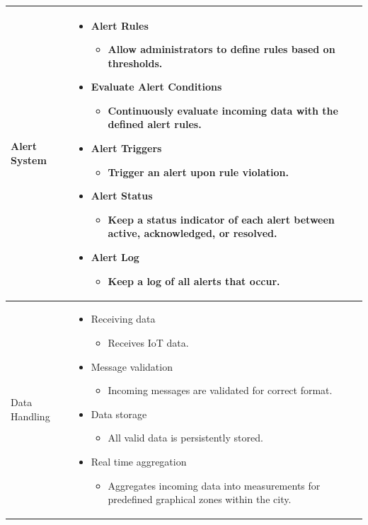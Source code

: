 \documentclass[]{article}
\begin{document}
\begin{longtable}{|p{3cm}|p{12cm}|}
Alert System &
\begin{itemize}
    \item Alert Rules
        \begin{itemize}
            \item Allow administrators to define rules based on thresholds.
        \end{itemize}
    \item Evaluate Alert Conditions
        \begin{itemize}
            \item Continuously evaluate incoming data with the defined alert rules.
        \end{itemize}
    \item Alert Triggers
        \begin{itemize}
            \item Trigger an alert upon rule violation.
        \end{itemize}
    \item Alert Status
        \begin{itemize}
            \item Keep a status indicator of each alert between active, acknowledged, or resolved.
        \end{itemize}
    \item Alert Log
        \begin{itemize}
            \item Keep a log of all alerts that occur.
        \end{itemize}
\end{itemize}
\\[5pt]
\hline

Data Handling & 
\begin{itemize}
    \item Receiving data
        \begin{itemize}
            \item Receives IoT data.
        \end{itemize}
    \item Message validation
        \begin{itemize}
            \item Incoming messages are validated for correct format.
        \end{itemize}
    \item Data storage
        \begin{itemize}
            \item All valid data is persistently stored.
        \end{itemize}
    \item Real time aggregation
        \begin{itemize}
            \item Aggregates incoming data into measurements for predefined graphical zones within the city.
        \end{itemize}
\end{itemize}
\\[5pt]
\hline


\end{longtable}
\end{document}
